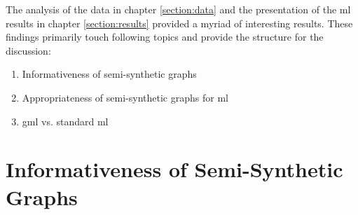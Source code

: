
  The analysis of the data in chapter \ref{section:data} and the presentation
  of the \acs{ml} results in chapter \ref{section:results} provided a
  myriad of interesting results. These findings primarily touch following topics
  and provide the structure for the discussion:

  \begin{enumerate}
      \item Informativeness of semi-synthetic graphs
      \item Appropriateness of semi-synthetic graphs for \acs{ml}
      \item \acs{gml} vs. standard \acs{ml}
  \end{enumerate}

  \section[Informativeness of Graphs]{Informativeness of Semi-Synthetic Graphs}
  \label{section:informativeness}

